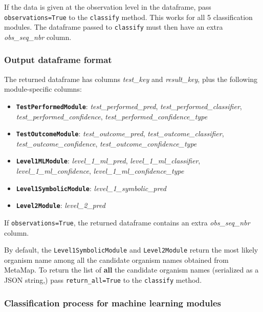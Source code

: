 \documentclass[a4paper]{article}
\begin{document}
If the data is given at the observation level in the dataframe, pass \lstinline{observations=True} to the \lstinline{classify} method. This works for all 5 classification modules. The dataframe passed to \lstinline{classify} must then have an extra \textit{obs\_seq\_nbr} column.

\subsubsection{Output dataframe format}

The returned dataframe has columns \textit{test\_key} and \textit{result\_key}, plus the following module-specific columns:

\begin{itemize}
\item \textbf{\lstinline{TestPerformedModule}}: \textit{test\_performed\_pred}, \textit{test\_performed\_classifier}, \textit{test\_performed\_confidence}, \textit{test\_performed\_confidence\_type}
\item \textbf{\lstinline{TestOutcomeModule}}: \textit{test\_outcome\_pred}, \textit{test\_outcome\_classifier}, \textit{test\_outcome\_confidence}, \textit{test\_outcome\_confidence\_type}
\item \textbf{\lstinline{Level1MLModule}}: \textit{level\_1\_ml\_pred}, \textit{level\_1\_ml\_classifier}, \textit{level\_1\_ml\_confidence}, \linebreak \textit{level\_1\_ml\_confidence\_type}
\item \textbf{\lstinline{Level1SymbolicModule}}: \textit{level\_1\_symbolic\_pred}
\item \textbf{\lstinline{Level2Module}}: \textit{level\_2\_pred}
\end{itemize}

If \lstinline{observations=True}, the returned dataframe contains an extra \textit{obs\_seq\_nbr} column.

By default, the \lstinline{Level1SymbolicModule} and \lstinline{Level2Module} return the most likely organism name among all the candidate organism names obtained from MetaMap. To return the list of \textbf{all} the candidate organism names (serialized as a JSON string,) pass \lstinline{return_all=True} to the \lstinline{classify} method.

\subsubsection{Classification process for machine learning modules}
\end{document}
